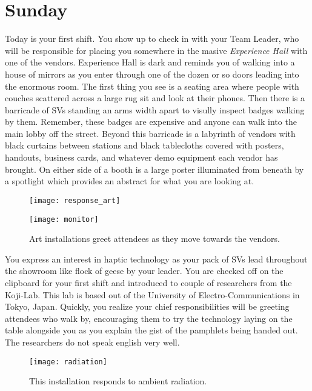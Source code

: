 \documentclass[../main.tex]{subfiles}
\begin{document}
\section{Sunday}

Today is your first shift. You show up to check in with your Team Leader, who will be responsible for placing you somewhere in the masive \textit{Experience Hall} with one of the vendors. Experience Hall is dark and reminds you of walking into a house of mirrors as you enter through one of the dozen or so doors leading into the enormous room. The first thing you see is a seating area where people with couches scattered across a large rug sit and look at their phones. Then there is a barricade of SVs standing an arms width apart to visully inspect badges walking by them. Remember, these badges are expensive and anyone can walk into the main lobby off the street. Beyond this barricade is a labyrinth of vendors with black curtains between stations and black tablecloths covered with posters, handouts, business cards, and whatever demo equipment each vendor has brought. On either side of a booth is a large poster illuminated from beneath by a spotlight which provides an abstract for what you are looking at.

\begin{figure}[!tbp]
	\centering
	\begin{minipage}[b]{0.45\textwidth}
		\texttt{[image: response\_art]}
	\end{minipage}
	\hfill
	\begin{minipage}[b]{0.45\textwidth}
		\texttt{[image: monitor]}
	\end{minipage}
	\caption*{Art installations greet attendees as they move towards the vendors.}
\end{figure}

You express an interest in haptic technology as your pack of SVs lead throughout the showroom like flock of geese by your leader. You are checked off on the clipboard for your first shift and introduced to couple of researchers from the Koji-Lab. This lab is based out of the University of Electro-Communications in Tokyo, Japan. Quickly, you realize your chief responsibilities will be greeting attendees who walk by, encouraging them to try the technology laying on the table alongside you as you explain the gist of the pamphlets being handed out. The researchers do not speak english very well.

\begin{figure}[h!]
	\centering
	\texttt{[image: radiation]}
	\caption*{This installation responds to ambient radiation.}
\end{figure}
\end{document}

